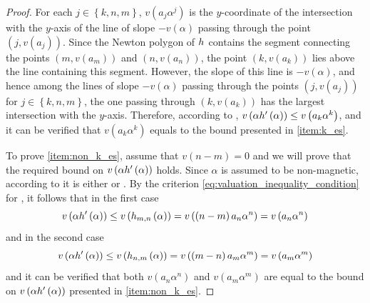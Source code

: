 \documentclass[../main.tex]{subfiles}
\begin{document}
  \begin{proof}
    For each $j \in \left\{ k,n,m \right\}$, $v\left( a_j \alpha^j \right)$ is the $y$-coordinate of the intersection with the $y$-axis of the line of slope $-v\left( \alpha \right)$ passing through the point $\left( j, v\left( a_j \right) \right)$.
    Since the Newton polygon of $h_{}$ contains the segment connecting the points $\left( m, v\left( a_m \right) \right)$ and $\left( n, v\left( a_n \right) \right)$, the point $\left( k, v\left( a_k \right) \right)$ lies above the line containing this segment.
    However, the slope of this line is $-v\left( \alpha \right)$, and hence among the lines of slope $-v\left( \alpha \right)$ passing through the points $\left( j, v\left( a_j \right) \right)$ for $j \in \left\{ k,n,m \right\}$, the one passing through $\left( k, v\left( a_k \right) \right)$ has the largest intersection with the $y$-axis.
    Therefore, according to , $v\left( \alpha h_{}'\left( \alpha \right) \right) \leq v\left( a_k \alpha^k \right)$, and it can be verified that $v\left( a_k \alpha^k \right)$ equals to the bound presented in \cref{item:k_es}.

    To prove \cref{item:non_k_es}, assume that $v\left( n - m \right) = 0$ and we will prove that the required bound on $v\left( \alpha h_{}'\left( \alpha \right) \right)$ holds.
    Since $\alpha$ is assumed to be non-magnetic, according to  it is either  or .
    By the criterion \cref{eq:valuation_inequality_condition} for , it follows that in the first case 
    $$
      v\left( \alpha h_{}'\left( \alpha \right) \right) 
      \leq 
      v\left( h_{m,n}\left( \alpha \right) \right)
      =
      v\left( \left( n - m \right) a_n \alpha^n \right)
      =
      v\left( a_n \alpha^n \right)
    $$
    and in the second case
    $$
      v\left( \alpha h_{}'\left( \alpha \right) \right) 
      \leq 
      v\left( h_{n,m}\left( \alpha \right) \right)
      =
      v\left( \left( m - n \right) a_m \alpha^m \right)
      =
      v\left( a_m \alpha^m \right)
    $$
    and it can be verified that both $v\left( a_n \alpha^n \right)$ and $v\left( a_m \alpha^m \right)$ are equal to the bound on $v\left( \alpha h_{}'\left( \alpha \right) \right)$ presented in \cref{item:non_k_es}.
  \end{proof}
\end{document}
